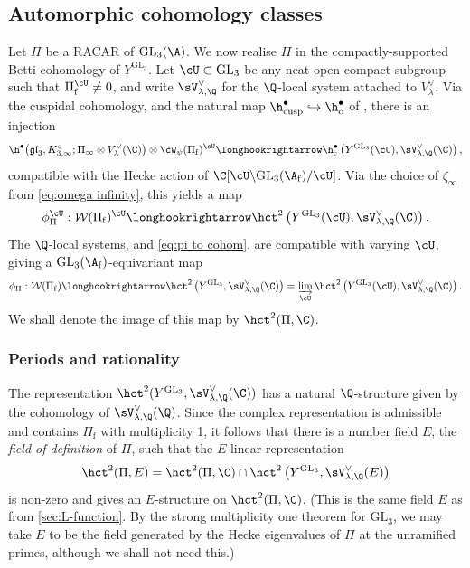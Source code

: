 \documentclass[10pt,reqno,a4paper]{amsart}
\newcommand{\Pif}{\Pi\subf}
\newcommand{\subf}{_{\mathrm{f}}}
\newcommand{\GL}{\mathrm{GL}}
\begin{document}
\subsection{Automorphic cohomology classes}\label{sec:auto cohom classes}

Let $\Pi$ be a RACAR of $\GL_3(\A)$. We now realise $\Pi$ in the compactly-supported Betti cohomology of $Y^{\GL_3}$. Let $\cU \subset \GL_3$ be any neat open compact subgroup such that $\Pif^{\cU} \ne 0$, and write $\sV_{\lambda,\Q}^\vee$ for the $\Q$-local system attached to $V_\lambda^\vee$. Via the cuspidal cohomology, and the natural map $\h^\bullet_{\mathrm{cusp}} \hookrightarrow \h^\bullet_{\mathrm{c}}$ of \cite[p.123]{Clo90}, there is an injection
\[
\h^\bullet\big(\mathfrak{gl}_3,K_{3,\infty}^\circ; \Pi_\infty\otimes V_{\lambda}^{\vee}(\C) \big)\otimes \cW_\psi(\Pif)^{\cU} \longhookrightarrow \h^\bullet_{\mathrm{c}}\left(Y^{\mathrm{GL}_3}(\cU), \sV_{\lambda,\Q}^\vee(\C)\right),
\]
compatible with the Hecke action of $\C[\cU \backslash \GL_3(\A\subf) / \cU]$. Via the choice of $\zeta_\infty$ from \eqref{eq:omega infinity}, this yields a map
\begin{equation}\label{eq:pi to cohom}
\phi_\Pi^{\cU}: \mathcal{W}(\Pif)^{\cU}\longhookrightarrow \hct^2\left(Y^{\mathrm{GL}_3}(\cU), \sV_{\lambda,\Q}^\vee(\C)\right).
\end{equation}
The $\Q$-local systems, and \eqref{eq:pi to cohom}, are compatible with varying $\cU$, giving a $\GL_3(\A\subf)$-equivariant map
\begin{equation}\label{eq:phi_Pi}
\phi_\Pi : \mathcal{W}(\Pif) \longhookrightarrow \hct^2\left(Y^{\mathrm{GL}_3}, \sV_{\lambda,\Q}^\vee(\C)\right) = \varinjlim_{\cU} \hct^2\left(Y^{\mathrm{GL}_3}(\cU), \sV_{\lambda,\Q}^\vee(\C)\right).
\end{equation}
We shall denote the image of this map by $\hct^2(\Pi, \C)$.


\subsubsection{Periods and rationality}\label{sec:periods}

The representation $\hct^2(Y^{\mathrm{GL}_3}, \sV_{\lambda,\Q}^\vee(\C))$ has a natural $\Q$-structure given by the cohomology of $\sV_{\lambda,\Q}^\vee(\Q)$. Since the complex representation is admissible and contains $\Pif$ with multiplicity 1, it follows that there is a number field $E$, the \emph{field of definition} of $\Pi$, such that the $E$-linear representation
\[ \hct^2(\Pi, E) = \hct^2(\Pi, \C) \cap \hct^2\left(Y^{\mathrm{GL}_3}, \sV_{\lambda,\Q}^\vee(E)\right) \]
is non-zero and gives an $E$-structure on $\hct^2(\Pi,\C)$. (This is the same field $E$ as from \cref{sec:L-function}. By the strong multiplicity one theorem for $\GL_3$, we may take $E$ to be the field generated by the Hecke eigenvalues of $\Pi$ at the unramified primes, although we shall not need this.)
\end{document}
